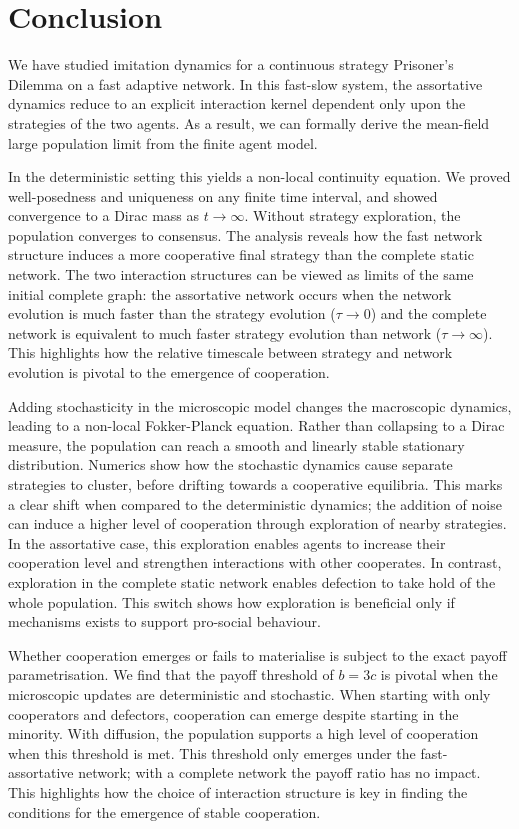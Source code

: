 \documentclass[10pt]{article}
\begin{document}
\section{Conclusion}\label{Section: Conclusion}

We have studied imitation dynamics for a continuous strategy Prisoner's Dilemma on a fast adaptive network. In this fast-slow system, the assortative dynamics reduce to an explicit interaction kernel dependent only upon the strategies of the two agents. As a result, we can formally derive the mean-field large population limit from the finite agent model.

In the deterministic setting this yields a non-local continuity equation. We proved well-posedness and uniqueness on any finite time interval, and showed convergence to a Dirac mass as $t \rightarrow \infty$. Without strategy exploration, the population converges to consensus. The analysis reveals how the fast network structure induces a more cooperative final strategy than the complete static network. The two interaction structures can be viewed as limits of the same initial complete graph: the assortative network occurs when the network evolution is much faster than the strategy evolution ($\tau\rightarrow 0$) and the complete network is equivalent to much faster strategy evolution than network ($\tau \rightarrow \infty$). This highlights how the relative timescale between strategy and network evolution is pivotal to the emergence of cooperation. 

Adding stochasticity in the microscopic model changes the macroscopic dynamics, leading to a non-local Fokker-Planck equation. Rather than collapsing to a Dirac measure, the population can reach a smooth and linearly stable stationary distribution. Numerics show how the stochastic dynamics cause separate strategies to cluster, before drifting towards a cooperative equilibria. This marks a clear shift when compared to the deterministic dynamics; the addition of noise can induce a higher level of cooperation through exploration of nearby strategies. In the assortative case, this exploration enables agents to increase their cooperation level and strengthen interactions with other cooperates. In contrast, exploration in the complete static network enables defection to take hold of the whole population. This switch shows how exploration is beneficial only if mechanisms exists to support pro-social behaviour.

Whether cooperation emerges or fails to materialise is subject to the exact payoff parametrisation. We find that the payoff threshold of $b=3c$ is pivotal when the microscopic updates are deterministic and stochastic. When starting with only cooperators and defectors, cooperation can emerge despite starting in the minority. With diffusion, the population supports a high level of cooperation when this threshold is met. This threshold only emerges under the fast-assortative network; with a complete network the payoff ratio has no impact. This highlights how the choice of interaction structure is key in finding the conditions for the emergence of stable cooperation. 
\end{document}
